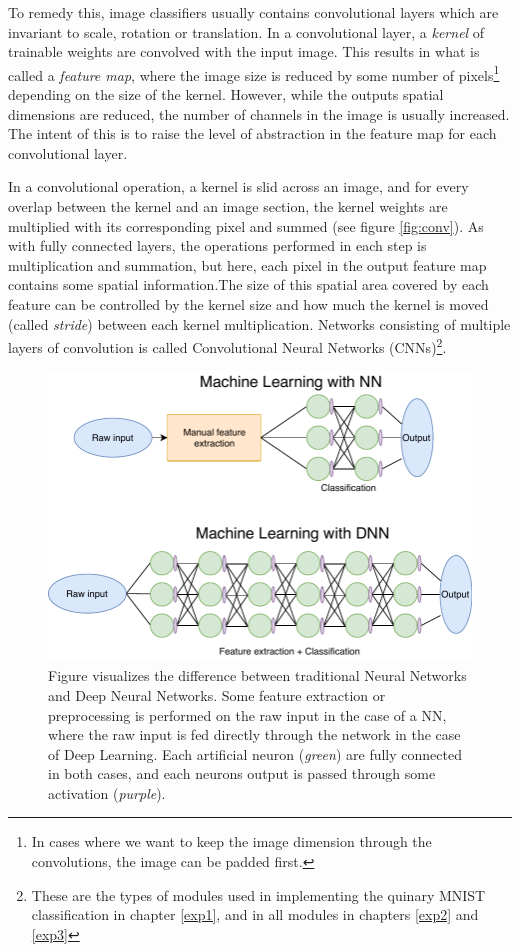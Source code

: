 To remedy this, image classifiers usually contains convolutional layers which are invariant to scale, rotation or translation. In a convolutional layer, a \textit{kernel} of trainable weights are convolved with the input image. This results in what is called a \textit{feature map}, where the image size is reduced by some number of pixels\footnote{In cases where we want to keep the image dimension through the convolutions, the image can be padded first.} depending on the size of the kernel. However, while the outputs spatial dimensions are reduced, the number of channels in the image is usually increased. The intent of this is to raise the level of abstraction in the feature map for each convolutional layer. 

In a convolutional operation, a kernel is slid across an image, and for every overlap between the kernel and an image section, the kernel weights are multiplied with its corresponding pixel and summed (see figure \ref{fig:conv}). As with fully connected layers, the operations performed in each step is multiplication and summation, but here, each pixel in the output feature map contains some spatial information.The size of this spatial area covered by each feature can be controlled by the kernel size and how much the kernel is moved (called \textit{stride}) between each kernel multiplication.
Networks consisting of multiple layers of convolution is called Convolutional Neural Networks (CNNs)\footnote{These are the types of modules used in implementing the quinary MNIST classification in chapter \ref{exp1}, and in all modules in chapters \ref{exp2} and \ref{exp3}}.

\begin{figure}[ht] 
    \centering
    \includegraphics[width=\linewidth]{Chapters/2.Background/figures/NNvsDNN_NY.pdf}
    \caption[NN vs. DNN]{Figure visualizes the difference between traditional Neural Networks and Deep Neural Networks. Some feature extraction or preprocessing is performed on the raw input in the case of a NN, where the raw input is fed directly through the network in the case of Deep Learning. Each artificial neuron (\textit{green}) are fully connected in both cases, and each neurons output is passed through some activation (\textit{purple}).}
    \label{fig:NNvsDNN}
\end{figure}

